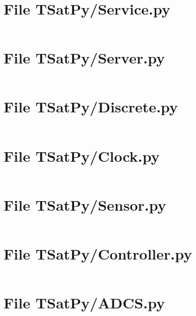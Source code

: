 \section{File TSatPy/Service.py}\label{code:TSatPy/Service.py}
\inputminted[linenos,fontsize=\scriptsize]{python}{/home/dcouture/git/mathyourlife/TSatPy/TSatPy/Service.py}

\section{File TSatPy/Server.py}\label{code:TSatPy/Server.py}
\inputminted[linenos,fontsize=\scriptsize]{python}{/home/dcouture/git/mathyourlife/TSatPy/TSatPy/Server.py}

\section{File TSatPy/Discrete.py}\label{code:TSatPy/Discrete.py}
\inputminted[linenos,fontsize=\scriptsize]{python}{/home/dcouture/git/mathyourlife/TSatPy/TSatPy/Discrete.py}

\section{File TSatPy/Clock.py}\label{code:TSatPy/Clock.py}
\inputminted[linenos,fontsize=\scriptsize]{python}{/home/dcouture/git/mathyourlife/TSatPy/TSatPy/Clock.py}

\section{File TSatPy/Sensor.py}\label{code:TSatPy/Sensor.py}
\inputminted[linenos,fontsize=\scriptsize]{python}{/home/dcouture/git/mathyourlife/TSatPy/TSatPy/Sensor.py}

\section{File TSatPy/Controller.py}\label{code:TSatPy/Controller.py}
\inputminted[linenos,fontsize=\scriptsize]{python}{/home/dcouture/git/mathyourlife/TSatPy/TSatPy/Controller.py}

\section{File TSatPy/ADCS.py}\label{code:TSatPy/ADCS.py}
\inputminted[linenos,fontsize=\scriptsize]{python}{/home/dcouture/git/mathyourlife/TSatPy/TSatPy/ADCS.py}
